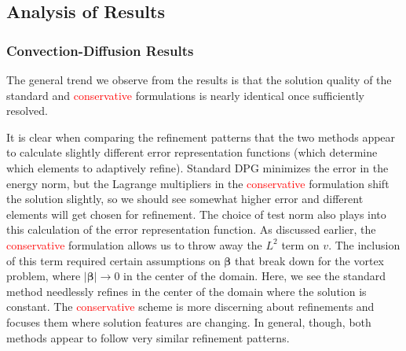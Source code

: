 \documentclass[letterpaper]{article}
\def\bbeta{\boldsymbol\beta}
\newcommand{\snorm}[1]{\left| #1 \right|}
\newcommand{\red}[1]{\textcolor{red}{#1}}
\begin{document}
\subsection{Analysis of Results}\label{sec:problemAnalysis}
\subsubsection{Convection-Diffusion Results}
The general trend we observe from the results is that the solution quality
of the standard and \red{conservative} formulations is nearly identical once
sufficiently resolved.


It is clear when comparing the refinement patterns that the two methods appear
to calculate slightly different error representation functions (which
determine which elements to adaptively refine). Standard DPG minimizes the
error in the energy norm, but the Lagrange multipliers in the \red{conservative}
formulation shift the solution slightly, so we should see somewhat higher
error and different elements will get chosen for refinement. The choice of
test norm also plays into this calculation of the error representation
function. As discussed earlier, the \red{conservative} formulation allows us to
throw away the $L^2$ term on $v$. The inclusion of this term required certain
assumptions on $\bbeta$ \cite{ChanHeuerThanhDemkowicz2012} that break down for
the vortex problem, where $\snorm{\bbeta}\rightarrow 0$ in the center of the domain. 
Here, we see the standard method needlessly refines
in the center of the domain where the solution is constant. The \red{conservative}
scheme is more discerning about refinements and focuses them where
solution features are changing. In general, though, both methods appear to
follow very similar refinement patterns.
\end{document}
